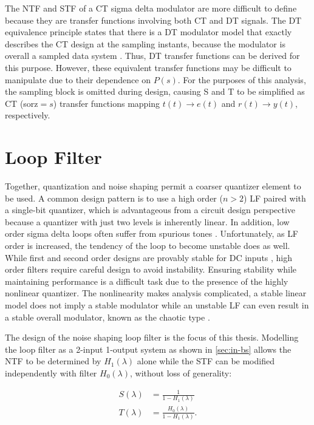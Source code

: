 The \gls{NTF} and \gls{STF} of a \gls{CT} sigma delta modulator are more difficult to define because they are transfer functions involving both \gls{CT} and \gls{DT} signals. The \gls{DT} equivalence principle states that there is a \gls{DT} modulator model that exactly describes the \gls{CT} design at the sampling instants, because the modulator is overall a sampled data system \cite[Sec. 3.2]{Ortmanns2005}. Thus, \gls{DT} transfer functions can be derived for this purpose. However, these equivalent transfer functions may be difficult to manipulate due to their dependence on $P(s)$. For the purposes of this analysis, the sampling block is omitted during design, causing \gls{S} and \gls{T} to be simplified as \gls{CT} (\gls{sorz}$=s$) transfer functions mapping $t(t) \rightarrow e(t)$ and $r(t) \rightarrow y(t)$, respectively.

\section{Loop Filter}
\label{sec:in-lf}

Together, quantization and noise shaping permit a coarser quantizer element to be used. A common design pattern is to use a high order ($n>2$)  \gls{LF} paired with a single-bit quantizer, which is advantageous from a circuit design perspective because a quantizer with just two levels is inherently linear. In addition, low order sigma delta loops often suffer from spurious tones \cite[Sec. 2.6.1]{Schreier1997}. Unfortunately, as \gls{LF} order is increased, the tendency of the loop to become unstable does as well. While first and second order designs are provably stable for DC inputs \cite{Hein1993}, high order filters require careful design to avoid instability. Ensuring stability while maintaining performance is a difficult task due to the presence of the highly nonlinear quantizer. The nonlinearity makes analysis complicated, a stable linear model does not imply a stable modulator while an unstable \gls{LF} can even result in a stable overall modulator, known as the chaotic type \cite{Risbo1994}.

The design of the noise shaping loop filter is the focus of this thesis. Modelling the loop filter as a 2-input 1-output system as shown in \autoref{sec:in-bs} allows the \gls{NTF} to be determined by $H_1(\lambda)$ alone while the \gls{STF} can be modified independently with filter $H_0(\lambda)$, without loss of generality:

\begin{align}
	S(\lambda) &= \frac{1}{1 - H_1(\lambda)} \label{eq:s} \\
	T(\lambda) &= \frac{H_0(\lambda)}{1 - H_1(\lambda)}. \label{eq:t}
\end{align}

